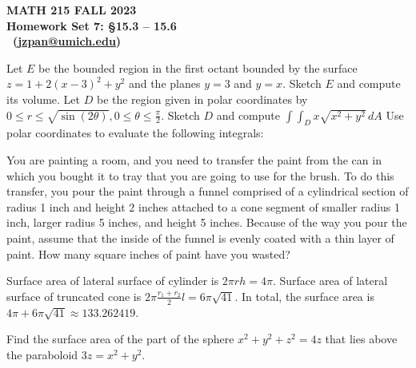 \documentclass[12pt]{exam}
\author{Zhengyu James Pan} %
\makeatletter
\def\hwName{Homework Set 7: §15.3 – 15.6}
\def\email{jzpan@umich.edu}
\makeatother
\begin{document}
\pagestyle{head}
\firstpageheader{}{}{}
\header{MATH 215}{\hwName}{\thepage}

\printanswers
\unframedsolutions

{\parindent0in
\begin{center}
	\bf MATH 215 FALL 2023\\
	\bf \hwName \\
	\@author\ (\href{mailto:\email}{\email})
\end{center}
}

\begin{questions}
\question Let $E$ be the bounded region in the first octant bounded by the surface $z = 1 + 2(x - 3)^2 + y^2$ and the planes $y = 3$ and $y = x$. Sketch $E$ and compute its volume.
\question Let $D$ be the region given in polar coordinates by $0 \leq r \leq \sqrt {\sin(2\theta)}, 0 \leq \theta \leq \frac{\pi}{2}$. Sketch $D$ and compute $\int \int_{D}x\sqrt{x^2 + y^2} \, dA$
\question Use polar coordinates to evaluate the following integrals:

\question  You are painting a room, and you need to transfer the paint from the can in which you bought it to tray that you are going to use for the brush. To do this transfer, you pour the paint through a funnel comprised of a cylindrical section of radius 1 inch and height 2 inches attached to a cone segment of smaller radius 1 inch, larger radius 5 inches, and height 5 inches. Because of the way you pour the paint, assume that the inside of the funnel is evenly coated with a thin layer of paint. How many square inches of paint have you wasted?
    \begin{solution}
        Surface area of lateral surface of cylinder is $2\pi r h = 4 \pi$.
        Surface area of lateral surface of truncated cone is $2\pi\frac{r_1 + r_2}{2} l = 6\pi \sqrt{41}$.
        In total, the surface area is $\boxed{ 4 \pi + 6\pi \sqrt{41} \approx 133.262419 }. $
    \end{solution}
\question Find the surface area of the part of the sphere $x^2+y^2+z^2 = 4z$ that lies above the paraboloid $3z = x^2+y^2$.
    \begin{solution}
        

\end{solution}
\end{questions}
\end{document}
